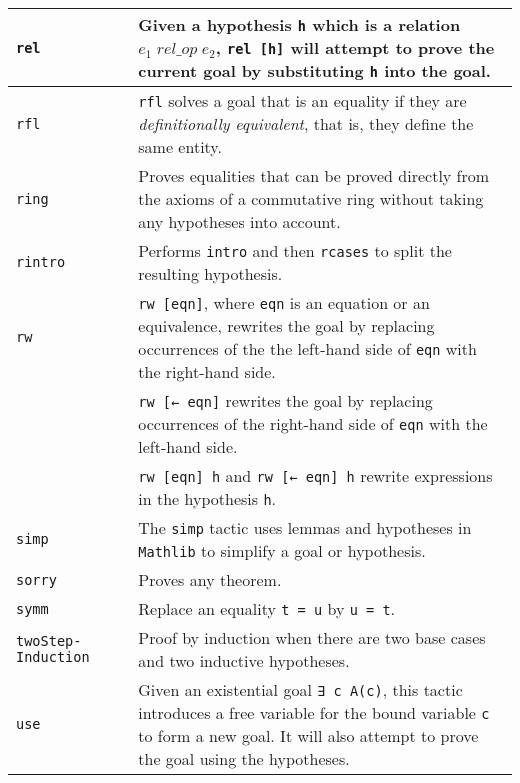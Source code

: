 \begin{tabular}{p{}|r|p{}}
\hline

\Verb+rel+&\pageref{p.rel}&Given a hypothesis \Verb+h+ which is a relation $\mathit{e_1 \; rel\_op \; e_2}$, \Verb+rel [h]+ will attempt to prove the current goal by substituting \Verb+h+ into the goal.\\\hline

\Verb+rfl+&\pageref{p.rfl}&\Verb+rfl+ solves a goal that is an equality if they are \emph{definitionally equivalent}, that is, they define the same entity.\\\hline

\Verb+ring+&\pageref{p.ring}&Proves equalities that can be proved directly from the axioms of a commutative ring without taking any hypotheses into account.\\\hline

\Verb+rintro+&\pageref{p.rintro}&Performs \Verb+intro+ and then \Verb+rcases+ to split the resulting hypothesis.\\\hline

\Verb+rw+&\pageref{p.rw}&\Verb+rw [eqn]+, where \Verb+eqn+ is an equation or an equivalence, rewrites the goal by replacing occurrences of the the left-hand side of \Verb+eqn+ with the right-hand side.\\
&&\Verb+rw [← eqn]+ rewrites the goal by replacing occurrences of the right-hand side of \Verb+eqn+ with the left-hand side.\\
&&\Verb+rw [eqn] h+ and \Verb+rw [← eqn] h+ rewrite expressions in the hypothesis \Verb+h+.\\\hline

\Verb+simp+&\pageref{p.simp}&The \Verb+simp+ tactic uses lemmas and hypotheses in \Verb+Mathlib+ to simplify a goal or hypothesis.\\\hline

\Verb+sorry+&\pageref{p.sorry}&Proves any theorem.\\\hline

\Verb+symm+&\pageref{p.symm}&Replace an equality \Verb+t = u+ by \Verb+u = t+.\\\hline

\Verb+twoStep-+ \Verb+Induction+&\pageref{p.two-step}&Proof by induction when there are two base cases and two inductive hypotheses.\\\hline

\Verb+use+&\pageref{p.use}&Given an existential goal \Verb+∃ c A(c)+, this tactic introduces a free variable for the bound variable \Verb+c+ to form a new goal. It will also attempt to prove the goal using the hypotheses.\\\hline

\end{tabular}

